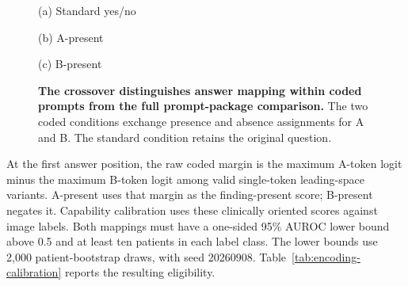 \begin{figure}[H]
\centering
\begin{minipage}{0.95\linewidth}
\small
{}
\par\smallskip\centerline{(a) Standard yes/no}\medskip
{}
\par\smallskip\centerline{(b) A-present}\medskip
{}
\par\smallskip\centerline{(c) B-present}
\end{minipage}
\caption{\textbf{The crossover distinguishes answer mapping within coded prompts from the full prompt-package comparison.} The two coded conditions exchange presence and absence assignments for A and B. The standard condition retains the original question.}
\label{fig:encoding-prompts}
\end{figure}

At the first answer position, the raw coded margin is the maximum A-token
logit minus the maximum B-token logit among valid single-token leading-space
variants. A-present uses that margin as the finding-present score;
B-present negates it. Capability calibration uses these clinically oriented
scores against image labels. Both mappings must have a one-sided 95\%
AUROC lower bound above 0.5 and at least ten patients in each label class.
The lower bounds use 2,000 patient-bootstrap draws, with seed 20260908.
Table~\ref{tab:encoding-calibration} reports the resulting eligibility.

